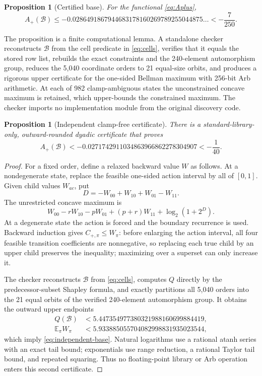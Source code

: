 \documentclass[11pt]{article}
\newtheorem{proposition}[theorem]{Proposition}
\theoremstyle{remark}
\newcommand{\B}{\mathcal B}
\newcommand{\E}{\mathbb E}
\begin{document}
\begin{proposition}[Certified base]
For the functional \eqref{eq:Aplus},
\begin{equation}
 A_+(\B)
 \le -0.0286491867944683178160269789255044875\ldots
 <-\frac7{250}.
 \label{eq:base-negative}
\end{equation}
\end{proposition}

\noindent
The proposition is a finite computational lemma.  A standalone checker
reconstructs $\B$ from the cell predicate in \eqref{eq:cells}, verifies that it
equals the stored row list, rebuilds the exact constraints and the 240-element
automorphism group, reduces the 5,040 coordinate orders to 21 equal-size
orbits, and produces a rigorous upper certificate for the one-sided Bellman
maximum with 256-bit Arb arithmetic. At each of 982 clamp-ambiguous states the
unconstrained concave maximum is retained, which upper-bounds the constrained
maximum. The checker imports no implementation module from the original
discovery code.

\begin{proposition}[Independent clamp-free certificate]
There is a standard-library-only, outward-rounded dyadic certificate that
proves
\[
 A_+(\B)
 <-0.0271742911034863966862278304907
 <-\frac1{40}.
\label{eq:independent-base}
\]
\end{proposition}
\begin{proof}
For a fixed order, define a relaxed backward value $W$ as follows.  At a
nondegenerate state, replace the feasible one-sided action interval by all of
$[0,1]$.  Given child values $W_{ac}$, put
\[
 D=-W_{00}+W_{10}+W_{01}-W_{11}.
\]
The unrestricted concave maximum is
\[
 W_{00}-rW_{10}-pW_{01}+(p+r)W_{11}
 +\log_2(1+2^D).
\]
At a degenerate state the action is forced and the boundary recurrence is
used.  Backward induction gives $C_{+,\pi}\le W_\pi$: before enlarging the
action interval, all four feasible transition coefficients are nonnegative,
so replacing each true child by an upper child preserves the inequality;
maximizing over a superset can only increase it.

The checker reconstructs $\B$ from \eqref{eq:cells}, computes $Q$ directly by
the predecessor-subset Shapley formula, and exactly partitions all 5,040
orders into the 21 equal orbits of the verified 240-element automorphism
group.  It obtains the outward upper endpoints
\[
\begin{aligned}
 Q(\B)&<5.447354977380321988160699884419,\\
 \E_\pi W_\pi&<5.933885055704082998831935023544,
\end{aligned}
\]
which imply \eqref{eq:independent-base}.  Natural logarithms use a rational
atanh series with an exact tail bound; exponentials use range reduction, a
rational Taylor tail bound, and repeated squaring.  Thus no floating-point
library or Arb operation enters this second certificate.
\end{proof}
\end{document}
